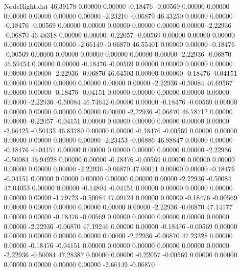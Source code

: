 \begin{filecontents}{NodeRight.dat}
  46.39178    0.00000    0.00000    -0.18476   -0.00569    0.00000    0.00000    0.00000    0.00000    0.00000    0.00000   -2.23210   -0.06879
  46.43250    0.00000    0.00000    -0.18476   -0.00569    0.00000    0.00000    0.00000    0.00000    0.00000    0.00000   -2.22936   -0.06870
  46.48318    0.00000    0.00000    -0.22057   -0.00569    0.00000    0.00000    0.00000    0.00000    0.00000    0.00000   -2.66149   -0.06870
  46.55401    0.00000    0.00000    -0.18476   -0.00569    0.00000    0.00000    0.00000    0.00000    0.00000    0.00000   -2.22936   -0.06870
  46.59454    0.00000    0.00000    -0.18476   -0.00569    0.00000    0.00000    0.00000    0.00000    0.00000    0.00000   -2.22936   -0.06870
  46.64503    0.00000    0.00000    -0.18476   -0.04151    0.00000    0.00000    0.00000    0.00000    0.00000    0.00000   -2.22936   -0.50084
  46.69567    0.00000    0.00000    -0.18476   -0.04151    0.00000    0.00000    0.00000    0.00000    0.00000    0.00000   -2.22936   -0.50084
  46.74642    0.00000    0.00000    -0.18476   -0.00569    0.00000    0.00000    0.00000    0.00000    0.00000    0.00000   -2.22936   -0.06870
  46.78712    0.00000    0.00000    -0.22057   -0.04151    0.00000    0.00000    0.00000    0.00000    0.00000    0.00000   -2.66425   -0.50135
  46.83780    0.00000    0.00000    -0.18476   -0.00569    0.00000    0.00000    0.00000    0.00000    0.00000    0.00000   -2.23453   -0.06886
  46.88847    0.00000    0.00000    -0.18476   -0.04151    0.00000    0.00000    0.00000    0.00000    0.00000    0.00000   -2.22936   -0.50084
  46.94928    0.00000    0.00000    -0.18476   -0.00569    0.00000    0.00000    0.00000    0.00000    0.00000    0.00000   -2.22936   -0.06870
  47.00011    0.00000    0.00000    -0.18476   -0.04151    0.00000    0.00000    0.00000    0.00000    0.00000    0.00000   -2.22936   -0.50084
  47.04053    0.00000    0.00000    -0.14894   -0.04151    0.00000    0.00000    0.00000    0.00000    0.00000    0.00000   -1.79723   -0.50084
  47.09124    0.00000    0.00000    -0.18476   -0.00569    0.00000    0.00000    0.00000    0.00000    0.00000    0.00000   -2.22936   -0.06870
  47.14177    0.00000    0.00000    -0.18476   -0.00569    0.00000    0.00000    0.00000    0.00000    0.00000    0.00000   -2.22936   -0.06870
  47.19246    0.00000    0.00000    -0.18476   -0.00569    0.00000    0.00000    0.00000    0.00000    0.00000    0.00000   -2.22936   -0.06870
  47.23328    0.00000    0.00000    -0.18476   -0.04151    0.00000    0.00000    0.00000    0.00000    0.00000    0.00000   -2.22936   -0.50084
  47.28387    0.00000    0.00000    -0.22057   -0.00569    0.00000    0.00000    0.00000    0.00000    0.00000    0.00000   -2.66149   -0.06870

\end{filecontents}
